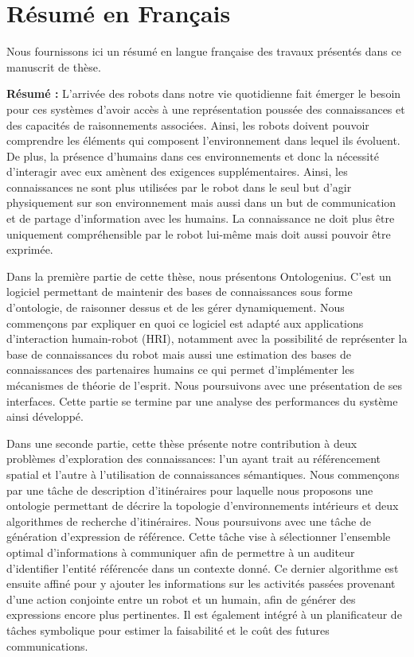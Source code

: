 \chapter{Résumé en Français}
\label{app:fr_small}

Nous fournissons ici un résumé en langue française des travaux présentés dans ce manuscrit de thèse.

\textbf{Résumé :}
L’arrivée des robots dans notre vie quotidienne fait émerger le besoin pour ces systèmes d’avoir accès à une représentation poussée des connaissances et des capacités de raisonnements associées. Ainsi, les robots doivent pouvoir comprendre les éléments qui composent l’environnement dans lequel ils évoluent. De plus, la présence d’humains dans ces environnements et donc la nécessité d’interagir avec eux amènent des exigences supplémentaires. Ainsi, les connaissances ne sont plus utilisées par le robot dans le seul but d’agir physiquement sur son environnement mais aussi dans un but de communication et de partage d’information avec les humains. La connaissance ne doit plus être uniquement compréhensible par le robot lui-même mais doit aussi pouvoir être exprimée.

Dans la première partie de cette thèse, nous présentons Ontologenius. C’est un logiciel permettant de maintenir des bases de connaissances sous forme d’ontologie, de raisonner dessus et de les gérer dynamiquement. Nous commençons par expliquer en quoi ce logiciel est adapté aux applications d’interaction humain-robot (HRI), notamment avec la possibilité de représenter la base de connaissances du robot mais aussi une estimation des bases de connaissances des partenaires humains ce qui permet d’implémenter les mécanismes de théorie de l’esprit. Nous poursuivons avec une présentation de ses interfaces. Cette partie se termine par une analyse des performances du système ainsi développé.

Dans une seconde partie, cette thèse présente notre contribution à deux problèmes d’exploration des connaissances: l’un ayant trait au référencement spatial et l’autre à l’utilisation de connaissances sémantiques. Nous commençons par une tâche de description d’itinéraires pour laquelle nous proposons une ontologie permettant de décrire la topologie d’environnements intérieurs et deux algorithmes de recherche d’itinéraires. Nous poursuivons avec une tâche de génération d’expression de référence. Cette tâche vise à sélectionner l’ensemble optimal d’informations à communiquer afin de permettre à un auditeur d’identifier l’entité référencée dans un contexte donné. Ce dernier algorithme est ensuite affiné pour y ajouter les informations sur les activités passées provenant d’une action conjointe entre un robot et un humain, afin de générer des expressions encore plus pertinentes. Il est également intégré à un planificateur de tâches symbolique pour estimer la faisabilité et le coût des futures communications.

